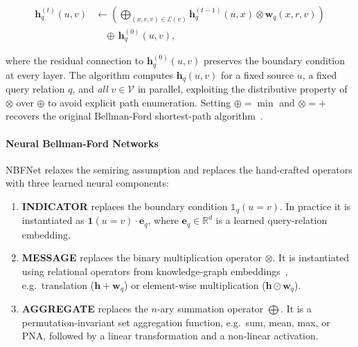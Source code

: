 \documentclass[10pt,journal,compsoc]{IEEEtran}
\begin{document}
\begin{equation}
\begin{split}
  \mathbf{h}_q^{(t)}(u,v)
    &\leftarrow
    \left(
      \bigoplus_{(x,r,v)\in\mathcal{E}(v)}
      \mathbf{h}_q^{(t-1)}(u,x) \otimes \mathbf{w}_q(x,r,v)
    \right) \\
    &\quad \oplus\, \mathbf{h}_q^{(0)}(u,v),
\end{split}
  \label{eq:nbfnet_prop}
\end{equation}





where the residual connection to $\mathbf{h}_q^{(0)}(u,v)$ preserves the boundary
condition at every layer.
The algorithm computes $\mathbf{h}_q(u,v)$ for a fixed source $u$, a fixed query
relation $q$, and \emph{all} $v\in\mathcal{V}$ in parallel, exploiting the
distributive property of $\otimes$ over $\oplus$ to avoid explicit path enumeration.
Setting $\oplus{=}\min$ and $\otimes{=}+$ recovers the original Bellman-Ford
shortest-path algorithm~\cite{bellman1958routing}.

\paragraph*{Neural Bellman-Ford Networks}
NBFNet relaxes the semiring assumption and replaces the hand-crafted operators
with three learned neural components:

\begin{enumerate}
  \item \textbf{INDICATOR} replaces the boundary condition
        $\mathbb{1}_q(u{=}v)$.  In practice it is instantiated as
        $\mathbf{1}(u{=}v)\cdot\mathbf{e}_q$, where $\mathbf{e}_q\in\mathbb{R}^d$
        is a learned query-relation embedding.
  \item \textbf{MESSAGE} replaces the binary multiplication operator $\otimes$.
        It is instantiated using relational operators from knowledge-graph
        embeddings~\cite{sun2019rotate},
        e.g.\ translation ($\mathbf{h}+\mathbf{w}_q$) or element-wise
        multiplication ($\mathbf{h}\odot\mathbf{w}_q$).
  \item \textbf{AGGREGATE} replaces the $n$-ary summation operator $\bigoplus$.
        It is a permutation-invariant set aggregation
        function, e.g.\ sum, mean, max, or PNA, followed
        by a linear transformation and a non-linear activation.
\end{enumerate}
\end{document}
